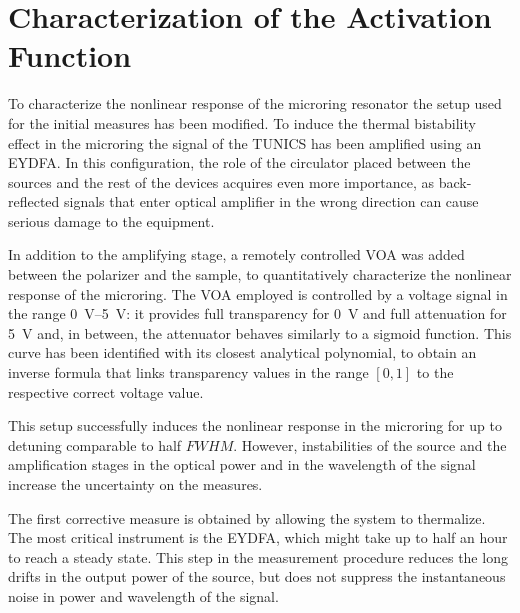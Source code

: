 \newpage
\section{Characterization of the Activation Function}
\label{sec:Characterization_of_the_Activation_Function}
To characterize the nonlinear response of the microring resonator the setup used for the initial measures has been modified.
To induce the thermal bistability effect in the microring the signal of the TUNICS has been amplified using an \ac{EYDFA}.
In this configuration, the role of the circulator placed between the sources and the rest of the devices acquires even more importance, as back-reflected signals that enter optical amplifier in the wrong direction can cause serious damage to the equipment.

In addition to the amplifying stage, a remotely controlled \ac{VOA} was added between the polarizer and the sample, to quantitatively characterize the nonlinear response of the microring. %
The \ac{VOA} employed is controlled by a voltage signal in the range \SIrange{0}{5}{\V}: it provides full transparency for \SI{0}{\V} and full attenuation for \SI{5}{\V} and, in between, the attenuator behaves similarly to a sigmoid function.
This curve has been identified with its closest analytical polynomial, to obtain an inverse formula that links transparency values in the range $[0,1]$ to the respective correct voltage value.

\begin{figure}[htbp]
	\centering
	
	\caption{}
	\label{fig:VOA}
\end{figure}%

This setup successfully induces the nonlinear response in the microring for up to detuning comparable to half $FWHM$.
However, instabilities of the source and the amplification stages in the optical power and in the wavelength of the signal increase the uncertainty on the measures.

The first corrective measure is obtained by allowing the system to thermalize.
The most critical instrument is the \ac{EYDFA}, which might take up to half an hour to reach a steady state.
This step in the measurement procedure reduces the long drifts in the output power of the source, but does not suppress the instantaneous noise in power and wavelength of the signal.

